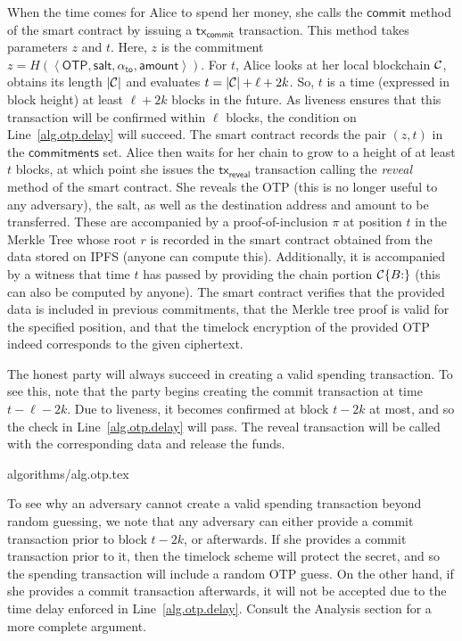 When the time comes for Alice to spend her money, she calls the $\textsf{commit}$ method
of the smart contract by issuing a $\textsf{tx}_\textsf{commit}$ transaction. This
method takes parameters $z$ and $t$. Here, $z$ is the commitment
$z = H(\left<\textsf{OTP}, \textsf{salt}, \alpha_{\textsf{to}}, \textsf{amount}\right>)$.
For $t$, Alice looks at her local blockchain $\mathcal{C}$, obtains its length $|\mathcal{C}|$
and evaluates $t = |\mathcal{C}| + \ell + 2k$.
So, $t$ is a time (expressed in block height) at least $\ell + 2k$ blocks in the future.
As liveness ensures that this transaction will be confirmed within $\ell$ blocks,
the condition on Line~\ref{alg.otp.delay} will succeed.
The smart contract records the pair $(z, t)$ in the $\textsf{commitments}$ set.
Alice then waits for her chain to grow to a height of at least $t$ blocks,
at which point she issues the $\textsf{tx}_\textsf{reveal}$ transaction
calling the \emph{reveal} method of the smart contract. She reveals
the OTP (this is no longer useful to any adversary), the salt, as well as
the destination address and amount to be transferred. These are accompanied
by a proof-of-inclusion $\pi$ at position $t$ in the Merkle Tree whose root $r$
is recorded in the smart contract obtained from the data stored on IPFS
(anyone can compute this). Additionally, it is accompanied by a witness that
time $t$ has passed by providing the chain portion $\mathcal{C}\{B{:}\}$ (this can
also be computed by anyone). The smart contract verifies that the provided
data is included in previous commitments, that the Merkle tree proof is
valid for the specified position, and that the timelock encryption of the
provided OTP indeed corresponds to the given ciphertext.

The honest party will always succeed in creating a valid spending transaction.
To see this, note that the party begins creating the commit transaction at time
$t - \ell - 2k$. Due to liveness, it becomes confirmed at block $t - 2k$ at most,
and so the check in Line~\ref{alg.otp.delay} will pass. The reveal transaction will
be called with the corresponding data and release the funds.

{algorithms/alg.otp.tex}

To see why an adversary cannot create a valid spending transaction beyond random
guessing, we note that any adversary can either provide a commit transaction prior
to block $t - 2k$, or afterwards. If she provides a commit transaction
prior to it, then the timelock scheme will protect the secret, and so the spending
transaction will include a random OTP guess. On the other hand, if she provides a
commit transaction afterwards, it will not be accepted due to the time delay enforced
in Line~\ref{alg.otp.delay}. Consult the Analysis section for a more complete argument.

